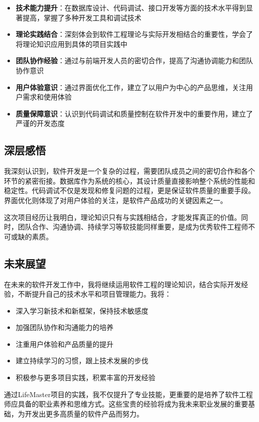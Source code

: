 \documentclass[a4paper]{article}
\begin{document}
\begin{itemize}
    \item \textbf{技术能力提升}：在数据库设计、代码调试、接口开发等方面的技术水平得到显著提高，掌握了多种开发工具和调试技术
    \item \textbf{理论实践结合}：深刻体会到软件工程理论与实际开发相结合的重要性，学会了将理论知识应用到具体的项目实践中
    \item \textbf{团队协作经验}：通过与前端开发人员的密切合作，提高了沟通协调能力和团队协作意识
    \item \textbf{用户体验意识}：通过界面优化工作，建立了以用户为中心的产品思维，关注用户需求和使用体验
    \item \textbf{质量保障意识}：认识到代码调试和质量控制在软件开发中的重要作用，建立了严谨的开发态度
\end{itemize}

\subsection{深层感悟}

我深刻认识到，软件开发是一个复杂的过程，需要团队成员之间的密切合作和各个环节的紧密衔接。数据库作为系统的核心，其设计质量直接影响整个系统的性能和稳定性。代码调试不仅是发现和修复问题的过程，更是保证软件质量的重要手段。界面优化则体现了对用户体验的关注，是软件产品成功的关键因素之一。

这次项目经历让我明白，理论知识只有与实践相结合，才能发挥真正的价值。同时，团队合作、沟通协调、持续学习等软技能同样重要，是成为优秀软件工程师不可或缺的素质。

\subsection{未来展望}

在未来的软件开发工作中，我将继续运用软件工程的理论知识，结合实际开发经验，不断提升自己的技术水平和项目管理能力。我将：

\begin{itemize}
    \item 深入学习新技术和新框架，保持技术敏感度
    \item 加强团队协作和沟通能力的培养
    \item 注重用户体验和产品质量的提升
    \item 建立持续学习的习惯，跟上技术发展的步伐
    \item 积极参与更多项目实践，积累丰富的开发经验
\end{itemize}

通过LifeMaster项目的实践，我不仅提升了专业技能，更重要的是培养了软件工程师应具备的职业素养和思维方式。这些宝贵的经验将成为我未来职业发展的重要基础，为开发出更多高质量的软件产品而努力。
\end{document}
